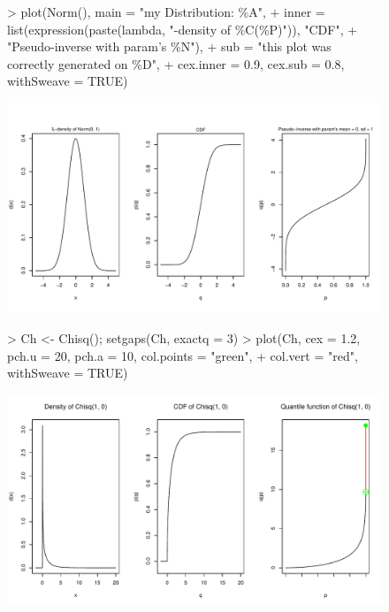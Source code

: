 \documentclass[11pt]{article}
\begin{document}
\begin{figure}[p]
\begin{Schunk}
\begin{Sinput}
> plot(Norm(), main = "my Distribution: \%A",
+      inner = list(expression(paste(lambda, "-density of \%C(\%P)")), "CDF",
+                   "Pseudo-inverse with param's \%N"),
+      sub = "this plot was correctly generated on \%D",
+      cex.inner = 0.9, cex.sub = 0.8, withSweave = TRUE)
\end{Sinput}
\end{Schunk}
\includegraphics{distr-plotex9}
\end{figure}

\begin{figure}[p]
\begin{Schunk}
\begin{Sinput}
> Ch <- Chisq(); setgaps(Ch, exactq = 3)
> plot(Ch, cex = 1.2, pch.u = 20, pch.a = 10, col.points = "green", 
+      col.vert = "red", withSweave = TRUE)
\end{Sinput}
\end{Schunk}
\includegraphics{distr-plotex10}
\end{figure}
\end{document}
